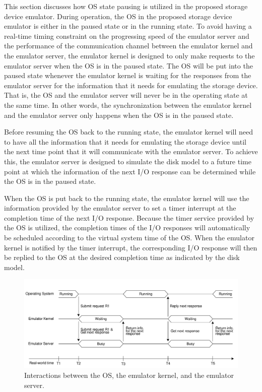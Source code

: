 This section discusses how OS state pausing is utilized in the proposed storage device emulator. During operation, the OS in the proposed storage device emulator is either in the paused state or in the running state. To avoid having a real-time timing constraint on the progressing speed of the emulator server and the performance of the communication channel between the emulator kernel and the emulator server, the emulator kernel is designed to only make requests to the emulator server when the OS is in the paused state. The OS will be put into the paused state whenever the emulator kernel is waiting for the responses from the emulator server for the information that it needs for emulating the storage device. That is, the OS and the emulator server will never be in the operating state at the same time. In other words, the synchronization between the emulator kernel and the emulator server only happens when the OS is in the paused state.

Before resuming the OS back to the running state, the emulator kernel will need to have all the information that it needs for emulating the storage device until the next time point that it will communicate with the emulator server. To achieve this, the emulator server is designed to simulate the disk model to a future time point at which the information of the next I/O response can be determined while the OS is in the paused state.

When the OS is put back to the running state, the emulator kernel will use the information provided by the emulator server to set a timer interrupt at the completion time of the next I/O response. Because the timer service provided by the OS is utilized, the completion times of the I/O responses will automatically be scheduled according to the virtual system time of the OS. When the emulator kernel is notified by the timer interrupt, the corresponding I/O response will then be replied to the OS at the desired completion time as indicated by the disk model.

\begin{figure}[htpb]
	\centering
	\includegraphics[width=\textwidth]{figures/ch6-fig-6.pdf}
	\caption{\label{fig:ch6-fig-6}Interactions between the OS, the emulator kernel, and the emulator server.}
\end{figure}

